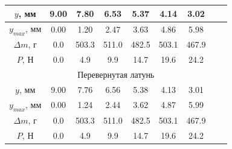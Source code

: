 \documentclass[12pt]{article}
\begin{document}
\begin{enumerate}
\begin{table}
\begin{tabular}{|ccccccccc|}
            \multicolumn{1}{|c|}{$y$, мм}       & \multicolumn{1}{c|}{9.00} & \multicolumn{1}{c|}{7.80}  & \multicolumn{1}{c|}{6.53}  & \multicolumn{1}{c|}{5.37}  & \multicolumn{1}{c|}{4.14}  & \multicolumn{1}{c|}{3.02}  & \multicolumn{1}{c|}{}      &       \\ \hline
            \multicolumn{1}{|c|}{$y_{max}$, мм} & \multicolumn{1}{c|}{0.00} & \multicolumn{1}{c|}{1.20}  & \multicolumn{1}{c|}{2.47}  & \multicolumn{1}{c|}{3.63}  & \multicolumn{1}{c|}{4.86}  & \multicolumn{1}{c|}{5.98}  & \multicolumn{1}{c|}{}      &       \\ \hline
            \multicolumn{1}{|c|}{$\Delta m$, г} & \multicolumn{1}{c|}{0.0}  & \multicolumn{1}{c|}{503.3} & \multicolumn{1}{c|}{511.0} & \multicolumn{1}{c|}{482.5} & \multicolumn{1}{c|}{503.1} & \multicolumn{1}{c|}{467.9} & \multicolumn{1}{c|}{}      &       \\ \hline
            \multicolumn{1}{|c|}{$P$, Н}        & \multicolumn{1}{c|}{0.0}  & \multicolumn{1}{c|}{4.9}   & \multicolumn{1}{c|}{9.9}   & \multicolumn{1}{c|}{14.7}  & \multicolumn{1}{c|}{19.6}  & \multicolumn{1}{c|}{24.2}  & \multicolumn{1}{c|}{}      &       \\ \hline
            \multicolumn{9}{|c|}{Перевернутая латунь}                                                                                                                                                                                                             \\ \hline
            \multicolumn{1}{|c|}{$y$, мм}       & \multicolumn{1}{c|}{9.00} & \multicolumn{1}{c|}{7.76}  & \multicolumn{1}{c|}{6.56}  & \multicolumn{1}{c|}{5.38}  & \multicolumn{1}{c|}{4.13}  & \multicolumn{1}{c|}{3.01}  & \multicolumn{1}{c|}{}      &       \\ \hline
            \multicolumn{1}{|c|}{$y_{max}$, мм} & \multicolumn{1}{c|}{0.00} & \multicolumn{1}{c|}{1.24}  & \multicolumn{1}{c|}{2.44}  & \multicolumn{1}{c|}{3.62}  & \multicolumn{1}{c|}{4.87}  & \multicolumn{1}{c|}{5.99}  & \multicolumn{1}{c|}{}      &       \\ \hline
            \multicolumn{1}{|c|}{$\Delta m$, г} & \multicolumn{1}{c|}{0.0}  & \multicolumn{1}{c|}{503.3} & \multicolumn{1}{c|}{511.0} & \multicolumn{1}{c|}{482.5} & \multicolumn{1}{c|}{503.1} & \multicolumn{1}{c|}{467.9} & \multicolumn{1}{c|}{}      &       \\ \hline
            \multicolumn{1}{|c|}{$P$, Н}        & \multicolumn{1}{c|}{0.0}  & \multicolumn{1}{c|}{4.9}   & \multicolumn{1}{c|}{9.9}   & \multicolumn{1}{c|}{14.7}  & \multicolumn{1}{c|}{19.6}  & \multicolumn{1}{c|}{24.2}  & \multicolumn{1}{c|}{}      &       \\ \hline
            \end{tabular}
        \end{table}

    \end{enumerate}
\end{document}

